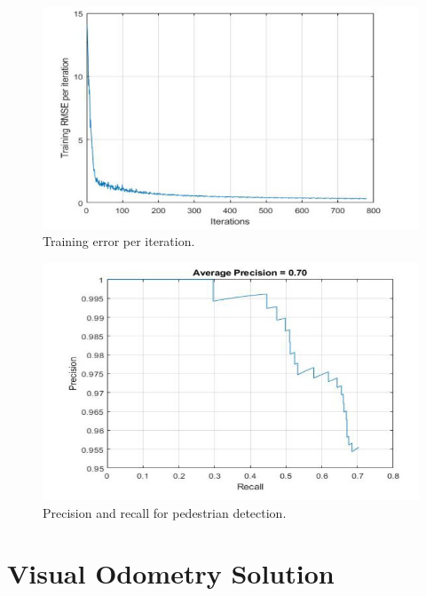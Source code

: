 \begin{figure}
    \centering
    \includegraphics{f5.jpg}
    \caption{Training error per iteration.}
      
\end{figure}
\begin{figure}
    \centering
    \includegraphics{f6.jpg}
    \caption{Precision and recall for pedestrian detection.}
    
\end{figure}
\section{Visual Odometry Solution} 

